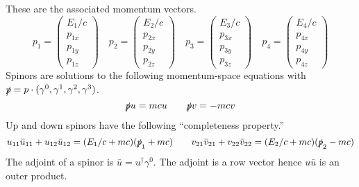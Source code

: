 \documentclass[12pt]{article}
\begin{document}
\noindent
These are the associated momentum vectors.
$$
p_1=\begin{pmatrix}E_1/c\\p_{1x}\\p_{1y}\\p_{1z}\end{pmatrix}\quad
p_2=\begin{pmatrix}E_2/c\\p_{2x}\\p_{2y}\\p_{2z}\end{pmatrix}\quad
p_3=\begin{pmatrix}E_3/c\\p_{3x}\\p_{3y}\\p_{3z}\end{pmatrix}\quad
p_4=\begin{pmatrix}E_4/c\\p_{4x}\\p_{4y}\\p_{4z}\end{pmatrix}
$$
Spinors are solutions to the following momentum-space equations with
$\slashed{p}=p\cdot(\gamma^0,\gamma^1,\gamma^2,\gamma^3)$.
$$
\slashed{p}u=mcu\qquad\slashed{p}v=-mcv
$$
Up and down spinors have the following ``completeness property.''
$$
u_{11}\bar{u}_{11}+u_{12}\bar{u}_{12}=(E_1/c+mc)(\slashed{p}_1+mc)\qquad
v_{21}\bar{v}_{21}+v_{22}\bar{v}_{22}=(E_2/c+mc)(\slashed{p}_2-mc)
$$
The adjoint of a spinor is $\bar{u}=u^\dag\gamma^0$.
The adjoint is a row vector hence $u\bar{u}$ is an outer product.
\end{document}
